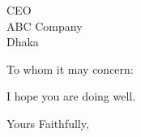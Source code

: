 \documentclass[12pt]{letter}
\begin{document}
  \begin{letter}{CEO \\ ABC Company \\ Dhaka }

    \opening{To whom it may concern:}

    I hope you are doing well.

    \blindtext

    \closing{Yours Faithfully,}

  \end{letter}
\end{document}
